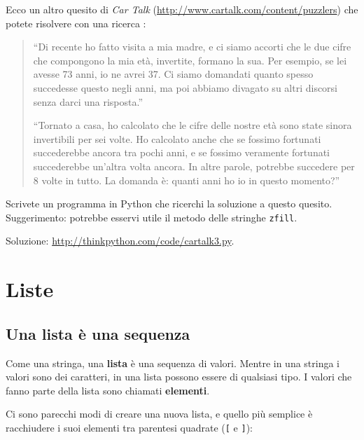 \documentclass[10pt]{book}
\begin{document}
\vspace{0.2in}
\begin{exercise}
Ecco un altro quesito di {\em Car Talk} (\url{http://www.cartalk.com/content/puzzlers}) che potete risolvere con una ricerca :

\begin{quote}
``Di recente ho fatto visita a mia madre, e ci siamo accorti che le due cifre che compongono la mia età, invertite, formano la sua. Per esempio, se lei avesse 73 anni, io ne avrei 37. Ci siamo domandati quanto spesso succedesse questo negli anni, ma poi abbiamo divagato su altri discorsi senza darci una risposta.''

``Tornato a casa, ho calcolato che le cifre delle nostre età sono state sinora invertibili per sei volte. Ho calcolato anche che se fossimo fortunati succederebbe ancora tra pochi anni, e se fossimo veramente fortunati succederebbe un'altra volta ancora. In altre parole, potrebbe succedere per 8 volte in tutto. La domanda è: quanti anni ho io in questo momento?''

\end{quote}

Scrivete un programma in Python che ricerchi la soluzione a questo quesito. Suggerimento: potrebbe esservi utile il metodo delle stringhe {\tt zfill}.

Soluzione: \url{http://thinkpython.com/code/cartalk3.py}.

\end{exercise}



\chapter{Liste}

\section{Una lista è una sequenza}
\label{sequence}

Come una stringa, una {\bf lista} è una sequenza di valori. Mentre in una stringa i valori sono dei caratteri, in una lista possono essere di qualsiasi tipo. I valori che fanno parte della lista sono chiamati {\bf elementi}.

Ci sono parecchi modi di creare una nuova lista, e quello più semplice
   è racchiudere i suoi elementi tra parentesi quadrate (\verb"[" e \verb"]"):
\end{document}
